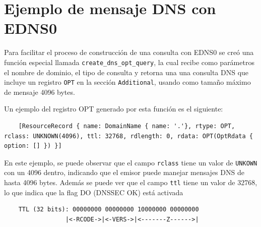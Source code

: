 \section{Ejemplo de mensaje DNS con EDNS0}

Para facilitar el proceso de construcción de una consulta con EDNS0 se creó una función especial llamada \texttt{create\_dns\_opt\_query}, la cual recibe
como parámetros el nombre de dominio, el tipo de consulta y retorna una una consulta DNS que incluye un registro \texttt{OPT} en la sección \texttt{Additional}, 
usando como tamaño máximo de mensaje 4096 bytes.

Un ejemplo del registro OPT generado por esta función es el siguiente:\\

\begin{lstlisting}
    [ResourceRecord { name: DomainName { name: '.'}, rtype: OPT, rclass: UNKNOWN(4096), ttl: 32768, rdlength: 0, rdata: OPT(OptRdata { option: [] }) }]
\end{lstlisting}

En este ejemplo, se puede observar que el campo \texttt{rclass} tiene un valor de \texttt{UNKOWN} con un 4096 dentro, indicando que el emisor puede manejar mensajes DNS de hasta 4096 bytes.
Además se puede ver que el campo \texttt{ttl} tiene un valor de 32768, lo que indica que la flag DO (DNSSEC OK) está activada\\

\begin{lstlisting}
    TTL (32 bits): 00000000 00000000 10000000 00000000
                 |<-RCODE->|<-VERS->|<-------Z------>|
\end{lstlisting}            